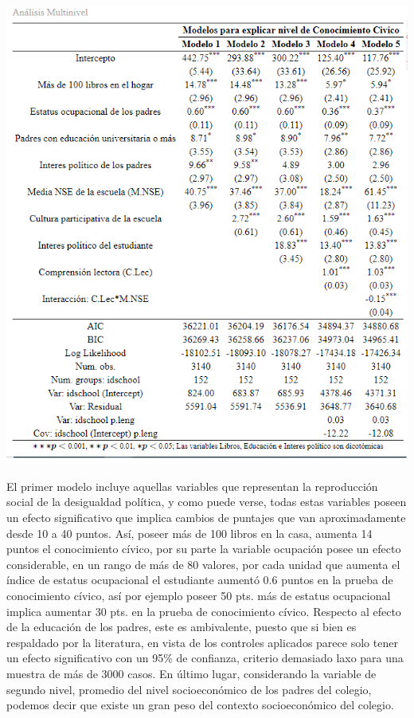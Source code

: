 \documentclass[12pt,twoside]{templates/facsothesis}
\begin{document}
\begin{center}\includegraphics[width=1.2\linewidth,]{images/regmultinivel} \end{center}

El primer modelo incluye aquellas variables que representan la reproducción social de la desigualdad política, y como puede verse, todas estas variables poseen un efecto significativo que implica cambios de puntajes que van aproximadamente desde 10 a 40 puntos. Así, poseer más de 100 libros en la casa, aumenta 14 puntos el conocimiento cívico, por su parte la variable ocupación posee un efecto considerable, en un rango de más de 80 valores, por cada unidad que aumenta el índice de estatus ocupacional el estudiante aumentó 0.6 puntos en la prueba de conocimiento cívico, así por ejemplo poseer 50 pts. más de estatus ocupacional implica aumentar 30 pts. en la prueba de conocimiento cívico. Respecto al efecto de la educación de los padres, este es ambivalente, puesto que si bien es respaldado por la literatura, en vista de los controles aplicados parece solo tener un efecto significativo con un 95\% de confianza, criterio demasiado laxo para una muestra de más de 3000 casos. En último lugar, considerando la variable de segundo nivel, promedio del nivel socioeconómico de los padres del colegio, podemos decir que existe un gran peso del contexto socioeconómico del colegio.
\end{document}
